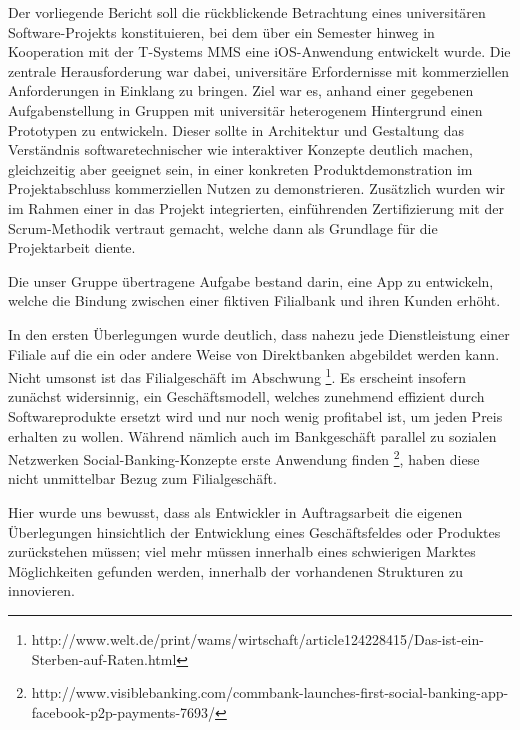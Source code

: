 
Der vorliegende Bericht soll die rückblickende Betrachtung eines universitären Software-Pro\-jekts konstituieren, bei dem über ein Semester hinweg in Kooperation mit der T-Systems MMS eine iOS-Anwendung entwickelt wurde. Die zentrale Herausforderung war dabei, universitäre Erfordernisse mit kommerziellen Anforderungen in Einklang zu bringen. Ziel war es, anhand einer gegebenen Aufgabenstellung in Gruppen mit universitär heterogenem Hintergrund einen Prototypen zu entwickeln.
Dieser sollte in Architektur und Gestaltung das Verständnis softwaretechnischer wie interaktiver Konzepte deutlich machen, gleichzeitig aber geeignet sein, in einer konkreten Produktdemonstration im Projektabschluss kommerziellen Nutzen zu demonstrieren.
Zusätzlich wurden wir im Rahmen einer in das Projekt integrierten, einführenden Zertifizierung mit der Scrum-Methodik vertraut gemacht, welche dann als Grundlage für die Projektarbeit diente. 

	Die unser Gruppe übertragene Aufgabe bestand darin, eine App zu entwickeln, welche die Bindung zwischen einer fiktiven Filialbank und ihren Kunden erhöht.
	
	 In den ersten Überlegungen wurde deutlich, dass nahezu jede Dienstleistung einer Filiale auf die ein oder andere Weise von Direktbanken abgebildet werden kann. Nicht umsonst ist das Filialgeschäft im Abschwung \footnote{http://www.welt.de/print/wams/wirtschaft/article124228415/Das-ist-ein-Sterben-auf-Raten.html}. Es erscheint insofern zunächst widersinnig, ein Geschäftsmodell, welches zunehmend effizient durch Softwareprodukte ersetzt wird und nur noch wenig profitabel ist, um jeden Preis erhalten zu wollen. Während nämlich auch im Bankgeschäft parallel zu sozialen Netzwerken Social-Banking-Konzepte erste Anwendung finden \footnote{http://www.visiblebanking.com/commbank-launches-first-social-banking-app-facebook-p2p-payments-7693/}, haben diese nicht unmittelbar Bezug zum Filialgeschäft.
	 
	 Hier wurde uns bewusst, dass als Entwickler in Auftragsarbeit die eigenen Überlegungen hinsichtlich der Entwicklung eines Geschäftsfeldes oder Produktes zurückstehen müssen; viel mehr müssen innerhalb eines schwierigen Marktes Möglichkeiten gefunden werden, innerhalb der vorhandenen Strukturen zu innovieren.
	 